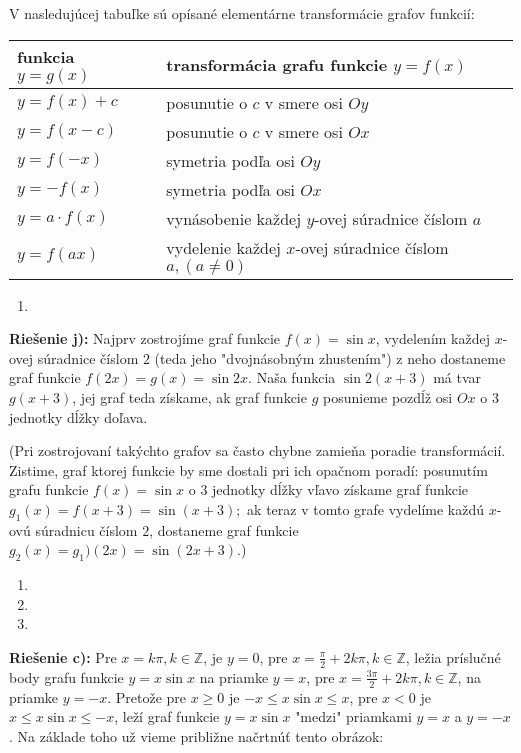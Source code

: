 V nasledujúcej tabuľke sú opísané elementárne transformácie grafov funkcií:

\begin{tabular}{|l|p{10cm}|}
  \hline
  {\bf funkcia $y=g(x)$} & {\bf transformácia grafu funkcie $y=f(x)$}  \\
  \hline \hline
  $y=f(x)+c$  & posunutie o $c$ v smere osi $Oy$ \\
  $y=f(x-c)$  & posunutie o $c$ v smere osi $Ox$ \\
  $y=f(-x)$  & symetria podľa osi $Oy$ \\
  $y=-f(x)$  & symetria podľa osi $Ox$ \\
  $y=a\cdot f(x)$  & vynásobenie každej $y$-ovej súradnice číslom $a$ \\
  $y=f(ax)$  & vydelenie každej $x$-ovej súradnice číslom $a,(a\neq 0)$ \\
  \hline
\end{tabular}

\begin{enumerate}[resume]
  \item {}
\end{enumerate}

\textbf{Riešenie j):} Najprv zostrojíme graf funkcie $f(x)=\sin x$, vydelením každej $x$-ovej súradnice číslom $2$ (teda jeho "dvojnásobným zhustením") z neho dostaneme graf funkcie $f(2x)=g(x)=\sin 2x$. Naša funkcia $\sin 2(x+3)$ má tvar $g(x+3)$, jej graf teda získame, ak graf funkcie $g$ posunieme pozdĺž osi $Ox$ o $3$ jednotky dĺžky doľava.

(Pri zostrojovaní takýchto grafov sa často chybne zamieňa poradie transformácií. Zistime, graf ktorej funkcie by sme dostali pri ich opačnom poradí: posunutím grafu funkcie $f(x)=\sin x$ o $3$ jednotky dĺžky vľavo získame graf funkcie $g_1(x)=f(x+3)=\sin (x+3);$ ak teraz v tomto grafe vydelíme každú $x$-ovú súradnicu číslom $2$, dostaneme graf funkcie $g_2(x)=g_1)(2x)=\sin (2x+3)$.)

\begin{enumerate}[resume]
  \item {}
  \item {}
  \item {}
\end{enumerate}

\textbf{Riešenie c):} Pre $x=k\pi,k\in\mathbb{Z}$, je $y=0$, pre $x=\frac{\pi}{2}+2k\pi,k\in\mathbb{Z}$, ležia príslučné body grafu funkcie $y=x\sin x$ na priamke $y=x$, pre $x=\frac{3\pi}{2}+2k\pi,k\in\mathbb{Z}$, na priamke $y=-x$. Pretože pre $x\geq 0$ je $-x\leq x\sin x\leq x$, pre $x<0$ je $x\leq x\sin x\leq -x$, leží graf funkcie $y=x\sin x$ "medzi" priamkami $y=x$ a $y=-x$. Na základe toho už vieme približne načrtnúť tento obrázok:


